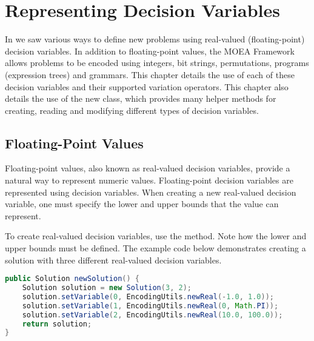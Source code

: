 %
%

\chapter{Representing Decision Variables}
\label{chpt:representations}

In  we saw various ways to define new problems using real-valued (floating-point) decision variables.  In addition to floating-point values, the MOEA Framework allows problems to be encoded using integers, bit strings, permutations, programs (expression trees) and grammars.  This chapter details the use of each of these decision variables and their supported variation operators.  This chapter also details the use of the new  class, which provides many helper methods for creating, reading and modifying different types of decision variables.

\section{Floating-Point Values}
Floating-point values, also known as real-valued decision variables, provide a natural way to represent numeric values.  Floating-point decision variables are represented using  decision variables.  When creating a new real-valued decision variable, one must specify the lower and upper bounds that the value can represent.

To create real-valued decision variables, use the  method.  Note how the lower and upper bounds must be defined.  The example code below demonstrates creating a solution with three different real-valued decision variables.
\begin{lstlisting}[language=Java]
public Solution newSolution() {
    Solution solution = new Solution(3, 2);
    solution.setVariable(0, EncodingUtils.newReal(-1.0, 1.0));
    solution.setVariable(1, EncodingUtils.newReal(0, Math.PI));
    solution.setVariable(2, EncodingUtils.newReal(10.0, 100.0));
    return solution;
}
\end{lstlisting}

